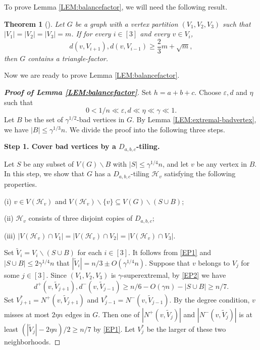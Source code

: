 \documentclass[11pt,a4paper,reqno]{amsart}
\newtheorem{theorem}{Theorem}[section]
\theoremstyle{definition} %
\begin{document}
To prove Lemma \ref{LEM:balancefactor}, we will need the following result.

\begin{theorem}[\cite{johanssonDM211}]\label{LEM:blowup}
Let $G$ be a graph with a vertex partition  $(V_1,V_2,V_3)$  such that $|V_1|=|V_2|=|V_3|=m$. If for every $i\in [3]$ and every $v\in V_i$,
$$
d(v, V_{i+1}),d(v,V_{i-1}) \geqslant \frac{2}{3}m + \sqrt{m},
$$
then $G$ contains a triangle-factor.
\end{theorem}

Now we are ready to prove Lemma \ref{LEM:balancefactor}. 

\begin{proof}[\textbf{Proof of Lemma \ref{LEM:balancefactor}}]
Set $h=a+b+c$. Choose $\varepsilon,d$ and $\eta$ such that
$$0<1/n\ll \varepsilon,d\ll \eta\ll\gamma \ll 1.$$  
Let $B$ be the set of $\gamma^{1/2}$-bad vertices in $G$. By Lemma \ref{LEM:extremal-badvertex}, we have $|B|\leqslant \gamma^{1/3}n$. We divide the proof into the following three steps.

\medskip
\textbf{Step 1. Cover bad vertices by a $D_{a,b,c}$-tiling.}
\medskip

Let $S$ be any subset of $V(G)\backslash B$ with $|S|\leqslant \gamma^{1/4}n$, and let $v$ be any vertex in $B$. In this step, we show that $G$ has a $D_{a,b,c}$-tiling $\mathcal{H}_v$ satisfying the following properties.

   (i) $v\in V(\mathcal{H}_v)$ and $V(\mathcal{H}_v)\backslash\{v\}\subseteq V(G)\backslash (S\cup B)$;
   
   (ii) $\mathcal{H}_v$ consists of three disjoint copies of $D_{a,b,c}$;

   (iii) $|V(\mathcal{H}_v)\cap V_1|=|V(\mathcal{H}_v)\cap V_2|=|V(\mathcal{H}_v)\cap V_3|$.
   
Set $\widetilde{V}_i= V_i\backslash (S\cup B)$ for each $i\in [3]$. It follows from \ref{EP1} and $|S\cup B|\leqslant 2 \gamma^{1/4}n$ that $|\widetilde{V}_i|=n/3\pm O(\gamma^{1/4}n)$. Suppose that $v$ belongs to $V_j$ for some $j\in [3]$. Since $(V_1,V_2,V_3)$ is $\gamma$-superextremal, by \ref{EP2} we have
$$
d^+(v,\widetilde{V}_{j+1}),d^-(v,\widetilde{V}_{j-1})\geqslant n/6-O(\gamma n)-|S\cup B|\geqslant n/7.
$$
Set $V^\ast_{j+1}=N^+(v,\widetilde{V}_{j+1})$ and $V^\ast_{j-1}=N^-(v,\widetilde{V}_{j-1})$. By the degree condition, $v$ misses at most $2\eta n$ edges in $G$. Then one of $|N^+(v,\widetilde{V}_{j})|$ and $|N^-(v,\widetilde{V}_{j})|$ is at least $(|\widetilde{V}_j|-2\eta n)/2\geqslant n/7$ by \ref{EP1}. Let $V^\ast_j$ be the larger of these two neighborhoods. 


\end{proof}
\end{document}
